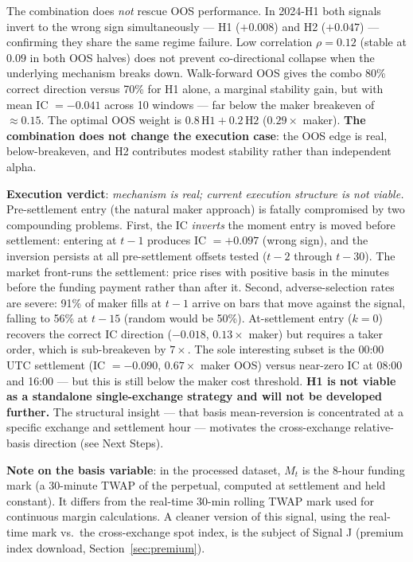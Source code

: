 \documentclass[12pt, a4paper]{article}
\theoremstyle{definition}
\begin{document}
The combination does \emph{not} rescue OOS performance.  In 2024-H1 both
signals invert to the wrong sign simultaneously --- H1 ($+0.008$) and
H2 ($+0.047$) --- confirming they share the same regime failure.  Low
correlation $\rho = 0.12$ (stable at $0.09$ in both OOS halves) does not
prevent co-directional collapse when the underlying mechanism breaks down.
Walk-forward OOS gives the combo 80\% correct direction versus 70\% for
H1 alone, a marginal stability gain, but with mean IC $= -0.041$ across
10 windows --- far below the maker breakeven of ${\approx}0.15$.
The optimal OOS weight is $0.8\,\text{H1} + 0.2\,\text{H2}$ ($0.29\times$
maker).  \textbf{The combination does not change the execution case}: the
OOS edge is real, below-breakeven, and H2 contributes modest stability
rather than independent alpha.

\textbf{Execution verdict}: \emph{mechanism is real; current execution
structure is not viable.}  Pre-settlement entry (the natural maker approach)
is fatally compromised by two compounding problems.  First, the IC
\emph{inverts} the moment entry is moved before settlement: entering at
$t-1$ produces IC $= +0.097$ (wrong sign), and the inversion persists at all
pre-settlement offsets tested ($t-2$ through $t-30$).  The market front-runs
the settlement: price rises with positive basis in the minutes before the
funding payment rather than after it.  Second, adverse-selection rates are
severe: 91\% of maker fills at $t-1$ arrive on bars that move against the
signal, falling to 56\% at $t-15$ (random would be 50\%).  At-settlement
entry ($k=0$) recovers the correct IC direction ($-0.018$, $0.13\times$
maker) but requires a taker order, which is sub-breakeven by $7\times$.
The sole interesting subset is the 00:00 UTC settlement (IC $= -0.090$,
$0.67\times$ maker OOS) versus near-zero IC at 08:00 and 16:00 --- but this
is still below the maker cost threshold.  \textbf{H1 is not viable as a
standalone single-exchange strategy and will not be developed further.}
The structural insight --- that basis mean-reversion is concentrated at a
specific exchange and settlement hour --- motivates the cross-exchange
relative-basis direction (see Next Steps).

\textbf{Note on the basis variable}: in the processed dataset, $M_t$ is the
8-hour funding mark (a 30-minute TWAP of the perpetual, computed at settlement
and held constant). It differs from the real-time 30-min rolling TWAP mark
used for continuous margin calculations. A cleaner version of this signal,
using the real-time mark vs.\ the cross-exchange spot index, is the subject
of Signal J (premium index download, Section~\ref{sec:premium}).
\end{document}

